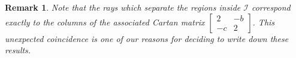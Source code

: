 \documentclass{amsart}
\newtheorem{remark}[theorem]{Remark}
\numberwithin{theorem}{section}
\newcommand{\cI}{\mathcal{I}}
\begin{document}
  \begin{remark}
    Note that the rays which separate the regions inside $\cI$ correspond exactly to the columns of the associated Cartan matrix $\left[ \begin{array}{cc} 2 & -b \\ -c & 2 \end{array} \right]$.
    This unexpected coincidence is one of our reasons for deciding to write down these results.
  \end{remark}
\end{document}

